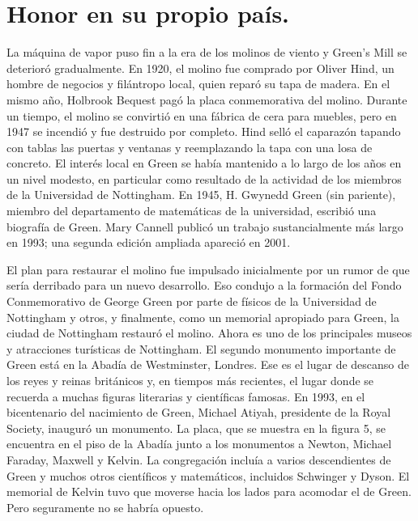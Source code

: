 \section{Honor en su propio país.}

La máquina de vapor puso fin a la era de los molinos de viento y Green's Mill se deterioró gradualmente. En 1920, el molino fue comprado por Oliver Hind, un hombre de negocios y filántropo local, quien reparó su tapa de madera. En el mismo año, Holbrook Bequest pagó la placa conmemorativa del molino. Durante un tiempo, el molino se convirtió en una fábrica de cera para muebles, pero en 1947 se incendió y fue destruido por completo. Hind selló el caparazón tapando con tablas las puertas y ventanas y reemplazando la tapa con una losa de concreto. El interés local en Green se había mantenido a lo largo de los años en un nivel modesto, en particular como resultado de la actividad de los miembros de la Universidad de Nottingham. En 1945, H. Gwynedd Green (sin pariente), miembro del departamento de matemáticas de la universidad, escribió una biografía de Green. Mary Cannell publicó un trabajo sustancialmente más largo en 1993; una segunda edición ampliada apareció en 2001.
\par
El plan para restaurar el molino fue impulsado inicialmente por un rumor de que sería derribado para un nuevo desarrollo. Eso condujo a la formación del Fondo Conmemorativo de George Green por parte de físicos de la Universidad de Nottingham y otros, y finalmente, como un memorial apropiado para Green, la ciudad de Nottingham restauró el molino. Ahora es uno de los principales museos y atracciones turísticas de Nottingham. El segundo monumento importante de Green está en la Abadía de Westminster, Londres. Ese es el lugar de descanso de los reyes y reinas británicos y, en tiempos más recientes, el lugar donde se recuerda a muchas figuras literarias y científicas famosas. En 1993, en el bicentenario del nacimiento de Green, Michael Atiyah, presidente de la Royal Society, inauguró un monumento. La placa, que se muestra en la figura 5, se encuentra en el piso de la Abadía junto a los monumentos a Newton, Michael Faraday, Maxwell y Kelvin. La congregación incluía a varios descendientes de Green y muchos otros científicos y matemáticos, incluidos Schwinger y Dyson. El memorial de Kelvin tuvo que moverse hacia los lados para acomodar el de Green. Pero seguramente no se habría opuesto.
